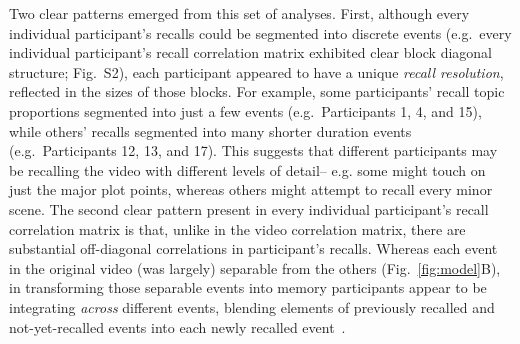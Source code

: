 \documentclass{article}
\newcommand{\corrmats}{S2}
\begin{document}
Two clear patterns emerged from this set of analyses.  First, although every individual participant's recalls could be segmented into discrete events (e.g.\ every individual participant's recall correlation matrix exhibited clear block diagonal structure; Fig.~\corrmats), each participant appeared to have a unique \textit{recall resolution}, reflected in the sizes of those blocks.  For example, some participants' recall topic proportions segmented into just a few events (e.g.\ Participants 1, 4, and 15), while others' recalls segmented into many shorter duration events (e.g.\ Participants 12, 13, and 17).  This suggests that different participants may be recalling the video with different levels of detail-- e.g. some might touch on just the major plot points, whereas others might attempt to recall every minor scene.  The second clear pattern present in every individual participant's recall correlation matrix is that, unlike in the video correlation matrix, there are substantial off-diagonal correlations in participant's recalls.  Whereas each event in the original video (was largely) separable from the others (Fig.~\ref{fig:model}B), in transforming those separable events into memory participants appear to be integrating \textit{across} different events, blending elements of previously recalled and not-yet-recalled events into each newly recalled event~\citep[Figs.~\ref{fig:model}D, \corrmats; also see][]{MannEtal11, HowaEtal12}.
\end{document}
